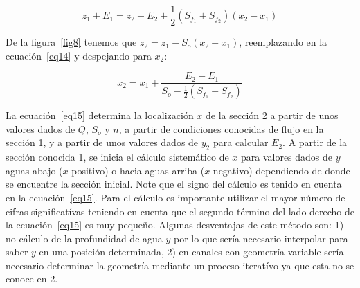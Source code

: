 \documentclass[11pt, oneside]{article}
\begin{document}
\begin{equation}
    z_1 + E_1 = z_2 + E_2  + \frac{1}{2}\left( S_{f_1} + S_{f_2} \right)  (x_2 - x_1)
\label{eq14}
\end{equation}

De la figura~\ref{fig8} tenemos que $z_2 = z_1 - S_o \left( x_2 - x_1 \right)$, reemplazando en la ecuaci\'on~\ref{eq14} y despejando para $x_2$:

\begin{equation}
    x_2 = x_1 + \frac{E_2 - E_1}{S_o - \frac{1}{2}\left( S_{f_1} + S_{f_2} \right)}
\label{eq15}
\end{equation}

La ecuaci\'on~\ref{eq15} determina la localizaci\'on $x$ de la secci\'on 2 a partir de unos valores dados de $Q$, $S_o$ y $n$, a partir de condiciones conocidas de flujo en la secci\'on 1, y a partir de unos valores dados de $y_2$ para calcular $E_2$. A partir de la secci\'on conocida 1, se inicia el c\'alculo sistem\'atico de $x$ para valores dados de $y$ aguas abajo ($x$ positivo) o hacia aguas arriba ($x$ negativo) dependiendo de donde se encuentre la secci\'on inicial. Note que el signo del c\'alculo es tenido en cuenta en la ecuaci\'on~\ref{eq15}. Para el c\'alculo es importante utilizar el mayor n\'umero de cifras significat\'ivas teniendo en cuenta que el segundo t\'ermino del lado derecho de la ecuaci\'on~\ref{eq15} es muy pequeño. Algunas desventajas de este m\'etodo son: 1) no c\'alculo de la profundidad de agua $y$ por lo que ser\'ia necesario interpolar para saber $y$ en una posici\'on  determinada, 2) en canales con geometr\'ia variable ser\'ia necesario determinar la geometr\'ia mediante un proceso iterat\'ivo ya que esta no se conoce en 2. 
\end{document}
